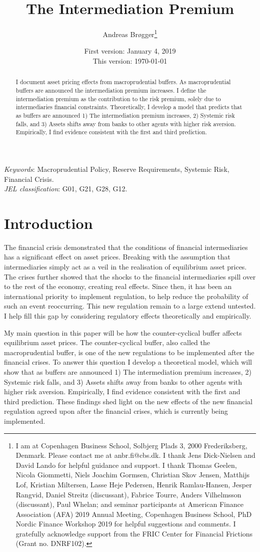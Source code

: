 \documentclass[11pt]{article}
\title{\Huge The Intermediation Premium}
\author{\Large Andreas Br\o gger\thanks{
\small
I am at Copenhagen Business School, Solbjerg Plads 3, 2000 Frederiksberg, Denmark.
Please contact me at anbr.fi@cbs.dk.
I thank Jens Dick-Nielsen and David Lando for helpful guidance and support.
I thank Thomas Geelen, Nicola Giommetti, Niels Joachim Gormsen, Christian Skov Jensen, Matthijs Lof, Kristian Miltersen, Lasse Heje Pedersen, Henrik Ramlau-Hansen, Jesper Rangvid, Daniel Streitz (discussant), Fabrice Tourre, Anders Vilhelmsson (discussant), Paul Whelan; and seminar participants at American Finance Association (AFA) 2019 Annual Meeting, Copenhagen Business School, PhD Nordic Finance Workshop 2019 for helpful suggestions and comments. I gratefully acknowledge support from the FRIC Center for Financial Frictions (Grant no. DNRF102).}
}
\date{\Large First version: January 4, 2019\\This version: \today}
\begin{document}
\maketitle

\begin{abstract}
\noindent I document asset pricing effects from macroprudential buffers. As macroprudential buffers are announced the intermediation premium increases. I define the intermediation premium as the contribution to the risk premium, solely due to intermediaries financial constraints. Theoretically, I develop a model that predicts that as buffers are announced 1) The intermediation premium increases, 2) Systemic risk falls, and 3) Assets shifts away from banks to other agents with higher risk aversion. Empirically, I find evidence consistent with the first and third prediction.
\end{abstract}

\noindent \textit{Keywords}: Macroprudential Policy, Reserve Requirements, Systemic Risk, Financial Crisis.\\
\noindent \textit{JEL classification}: G01, G21, G28, G12.

\clearpage
\renewcommand{\thefootnote}{\arabic{footnote}}


\section*{Introduction}
The financial crisis demonstrated that the conditions of financial intermediaries has a significant effect on asset prices. Breaking with the assumption that intermediaries simply act as a veil in the realisation of equilibrium asset prices. The crises further showed that the shocks to the financial intermediaries spill over to the rest of the economy, creating real effects. Since then, it has been an international priority to implement regulation, to help reduce the probability of such an event reoccurring. This new regulation remain to a large extend untested. I help fill this gap by considering regulatory effects theoretically and empirically.

My main question in this paper will be how the counter-cyclical buffer affects equilibrium asset prices. The counter-cyclical buffer, also called the macroprudential buffer, is one of the new regulations to be implemented after the financial crises. To answer this question I develop a theoretical model, which will show that as buffers are announced 1) The intermediation premium increases, 2) Systemic risk falls, and 3) Assets shifts away from banks to other agents with higher risk aversion. Empirically, I find evidence consistent with the first and third prediction. These findings shed light on the new effects of the new financial regulation agreed upon after the financial crises, which is currently being implemented.
\end{document}
